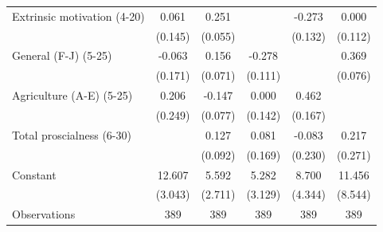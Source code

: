{\begin{tabular}{l*{5}{c}}
Extrinsic motivation (4-20)&0.061         &0.251\sym{***}&              &-0.273\sym{*}  &0.000         \\
                    &(0.145)         &(0.055)         &              &(0.132)         &(0.112)         \\
General (F-J) (5-25)&-0.063         &0.156\sym{*}  &-0.278\sym{**} &              &0.369\sym{***}\\
                    &(0.171)         &(0.071)         &(0.111)         &              &(0.076)         \\
Agriculture (A-E) (5-25)&0.206         &-0.147\sym{*}  &0.000         &0.462\sym{**} &              \\
                    &(0.249)         &(0.077)         &(0.142)         &(0.167)         &              \\
Total proscialness (6-30)&              &0.127         &0.081         &-0.083         &0.217         \\
                    &              &(0.092)         &(0.169)         &(0.230)         &(0.271)         \\
Constant            &12.607\sym{***}&5.592\sym{*}  &5.282         &8.700\sym{*}  &11.456         \\
                    &(3.043)         &(2.711)         &(3.129)         &(4.344)         &(8.544)         \\
\hline
Observations        &  389         &  389         &  389         &  389         &  389         \\
\hline\hline
\end{tabular}
}
